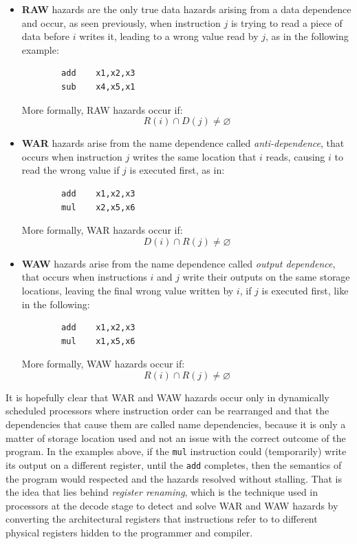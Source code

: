 \begin{itemize}
  \item \textbf{\ac{RAW}} hazards are the only true data hazards arising from a data dependence and occur, as seen previously, when instruction $j$ is trying to read a piece of data before $i$ writes it, leading to a wrong value read by $j$, as in the following example:
      \begin{verbatim}
        add    x1,x2,x3
        sub    x4,x5,x1
      \end{verbatim}
      More formally, \ac{RAW} hazards occur if:
      \begin{equation*}
        R(i) \cap D(j) \neq \varnothing
      \end{equation*}
  \item \textbf{\ac{WAR}} hazards arise from the name dependence called \emph{anti-dependence}, that occurs when instruction $j$ writes the same location that $i$ reads, causing $i$ to read the wrong value if $j$ is executed first, as in:
      \begin{verbatim}
        add    x1,x2,x3
        mul    x2,x5,x6
      \end{verbatim}
      More formally, \ac{WAR} hazards occur if:
      \begin{equation*}
        D(i) \cap R(j) \neq \varnothing
      \end{equation*}
  \item \textbf{\ac{WAW}} hazards arise from the name dependence called \emph{output dependence}, that occurs when instructions $i$ and $j$ write their outputs on the same storage locations, leaving the final wrong value written by $i$, if $j$ is executed first, like in the following:
      \begin{verbatim}
        add    x1,x2,x3
        mul    x1,x5,x6
      \end{verbatim}
      More formally, \ac{WAW} hazards occur if:
      \begin{equation*}
        R(i) \cap R(j) \neq \varnothing
      \end{equation*}
\end{itemize}

It is hopefully clear that \ac{WAR} and \ac{WAW} hazards occur only in dynamically scheduled processors where instruction order can be rearranged and that the dependencies that cause them are called name dependencies, because it is only a matter of storage location used and not an issue with the correct outcome of the program. In the examples above, if the \texttt{mul} instruction could (temporarily) write its output on a different register, until the \texttt{add} completes, then the semantics of the program would respected and the hazards resolved without stalling. That is the idea that lies behind \emph{register renaming}, which is the technique used in \ooo processors at the decode stage to detect and solve \ac{WAR} and \ac{WAW} hazards by converting the architectural registers that instructions refer to to different physical registers hidden to the programmer and compiler.

